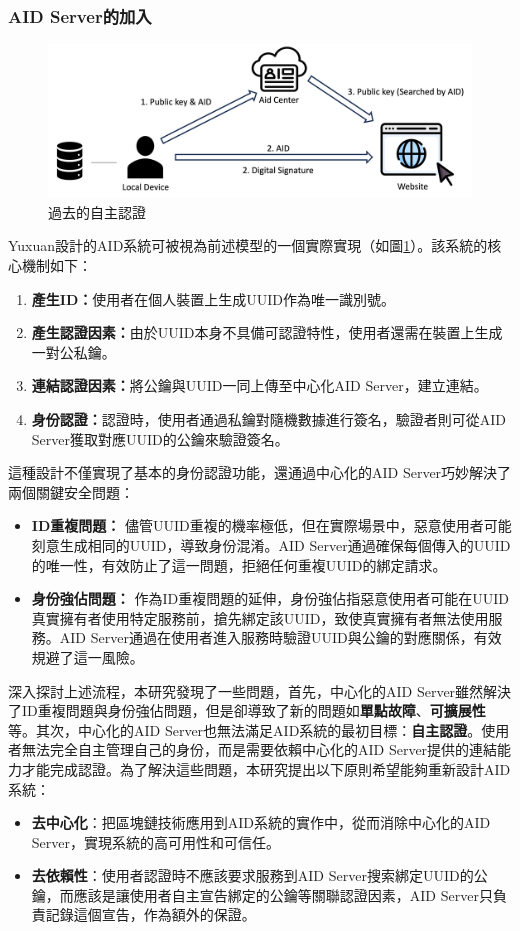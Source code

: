 \subsubsection{AID Server的加入}
\begin{figure}
  \centering
  \includegraphics[width=\linewidth]{figures/old-aid-login.png}
  \caption{過去的自主認證}
  \label{fig:old-aid-login}
\end{figure}
Yuxuan設計的AID系統\cite{ntu-lin2014autonomous}可被視為前述模型的一個實際實現（如圖\ref{fig:old-aid-login}）。該系統的核心機制如下：
\begin{enumerate}
  \item \textbf{產生ID：}使用者在個人裝置上生成UUID\cite{uuid}作為唯一識別號。
  \item \textbf{產生認證因素：}由於UUID本身不具備可認證特性，使用者還需在裝置上生成一對公私鑰。
  \item \textbf{連結認證因素：}將公鑰與UUID一同上傳至中心化AID Server，建立連結。
  \item \textbf{身份認證：}認證時，使用者通過私鑰對隨機數據進行簽名，驗證者則可從AID Server獲取對應UUID的公鑰來驗證簽名。
\end{enumerate}
這種設計不僅實現了基本的身份認證功能，還通過中心化的AID Server巧妙解決了兩個關鍵安全問題：
\begin{itemize}
  \item \textbf{ID重複問題：} 儘管UUID重複的機率極低，但在實際場景中，惡意使用者可能刻意生成相同的UUID，導致身份混淆。AID Server通過確保每個傳入的UUID的唯一性，有效防止了這一問題，拒絕任何重複UUID的綁定請求。
  \item \textbf{身份強佔問題：} 作為ID重複問題的延伸，身份強佔指惡意使用者可能在UUID真實擁有者使用特定服務前，搶先綁定該UUID，致使真實擁有者無法使用服務。AID Server通過在使用者進入服務時驗證UUID與公鑰的對應關係，有效規避了這一風險。
\end{itemize}

深入探討上述流程，本研究發現了一些問題，首先，中心化的AID Server雖然解決了ID重複問題與身份強佔問題，但是卻導致了新的問題如\textbf{單點故障}、\textbf{可擴展性}等。其次，中心化的AID Server也無法滿足AID系統的最初目標：\textbf{自主認證}。使用者無法完全自主管理自己的身份，而是需要依賴中心化的AID Server提供的連結能力才能完成認證。為了解決這些問題，本研究提出以下原則希望能夠重新設計AID系統：
\begin{itemize}
  \item \textbf{去中心化}：把區塊鏈技術應用到AID系統的實作中，從而消除中心化的AID Server，實現系統的高可用性和可信任。
  \item \textbf{去依賴性}：使用者認證時不應該要求服務到AID Server搜索綁定UUID的公鑰，而應該是讓使用者自主宣告綁定的公鑰等關聯認證因素，AID Server只負責記錄這個宣告，作為額外的保證。
\end{itemize}
